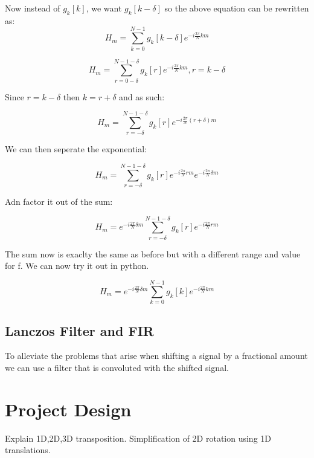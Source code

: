 \documentclass[]{usiinfbachelorproject}
\begin{document}
	Now instead of $g_k[k]$, we want $g_k[k - \delta]$
	so the above equation can be rewritten as:
	\begin{equation}
		H_m = \displaystyle\sum_{k=0}^{N-1}g_k[k - \delta]e^{-i \frac{2\pi}{N} km}
	\end{equation}
	
	\begin{equation}
		H_m = \displaystyle\sum_{r = 0 - \delta}^{N-1-\delta}g_k[r]e^{-i \frac{2\pi}{N} km}, r = k - \delta 
	\end{equation}
	
	Since $r = k - \delta$ then $ k = r + \delta$ and as such:
	
	\begin{equation}
		H_m = \displaystyle\sum_{r= -\delta}^{N-1 - \delta}g_k[r]e^{-i \frac{2\pi}{N} (r + \delta)m}
	\end{equation}
	
	We can then seperate the exponential:
	
	\begin{equation}
		H_m = \displaystyle\sum_{r= -\delta}^{N-1 - \delta}g_k[r]e^{-i \frac{2\pi}{N} rm}e^{-i \frac{2\pi}{N}  \delta m}
	\end{equation}
	
	Adn factor it out of the sum:
	
	\begin{equation}
		H_m = e^{-i \frac{2\pi}{N}  \delta m} \displaystyle\sum_{r= -\delta}^{N-1 - \delta}g_k[r]e^{-i \frac{2\pi}{N} rm}
	\end{equation}
	
	The sum now is exaclty the same as before but with a different range and value for f. We can now try it out in python.
	
	\begin{equation}
		H_m = e^{-i \frac{2\pi}{N}  \delta m} \displaystyle\sum_{k=0}^{N-1}g_k[k]e^{-i \frac{2\pi}{N} km}
	\end{equation}
	
	\subsection{Lanczos Filter and FIR}
	To alleviate the problems that arise when shifting a signal by a fractional amount we can use a filter that is convoluted with the shifted signal.
	
	
	
	
	\section{Project Design}
	Explain 1D,2D,3D transposition.
	Simplification of 2D rotation using 1D translations.
	
\end{document}

